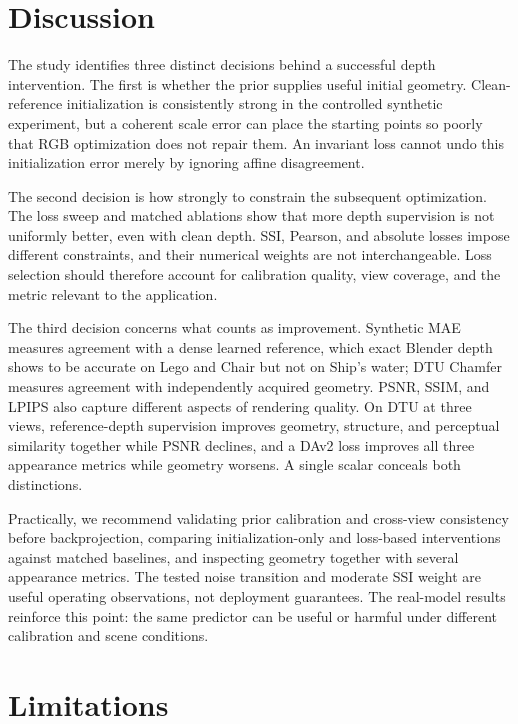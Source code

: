 \documentclass[10pt,a4paper]{article}
\begin{document}
\section{Discussion}

The study identifies three distinct decisions behind a successful depth intervention.
The first is whether the prior supplies useful initial geometry. Clean-reference
initialization is consistently strong in the controlled synthetic experiment, but a
coherent scale error can place the starting points so poorly that RGB optimization
does not repair them. An invariant loss cannot undo this initialization error merely
by ignoring affine disagreement.

The second decision is how strongly to constrain the subsequent optimization. The
loss sweep and matched ablations show that more depth supervision is not uniformly
better, even with clean depth. SSI, Pearson, and absolute losses impose different
constraints, and their numerical weights are not interchangeable. Loss selection
should therefore account for calibration quality, view coverage, and the metric
relevant to the application.

The third decision concerns what counts as improvement. Synthetic MAE measures
agreement with a dense learned reference, which exact Blender depth shows to be
accurate on Lego and Chair but not on Ship's water; DTU Chamfer measures agreement
with independently acquired geometry. PSNR, SSIM, and LPIPS also capture different
aspects of rendering quality. On DTU at three views, reference-depth supervision
improves geometry, structure, and perceptual similarity together while PSNR declines,
and a DAv2 loss improves all three appearance metrics while geometry worsens. A single
scalar conceals both distinctions.

Practically, we recommend validating prior calibration and cross-view consistency
before backprojection, comparing initialization-only and loss-based interventions
against matched baselines, and inspecting geometry together with several appearance
metrics. The tested noise transition and moderate SSI weight are useful operating
observations, not deployment guarantees. The real-model results reinforce this point:
the same predictor can be useful or harmful under different calibration and scene
conditions.

\section{Limitations}
\end{document}
